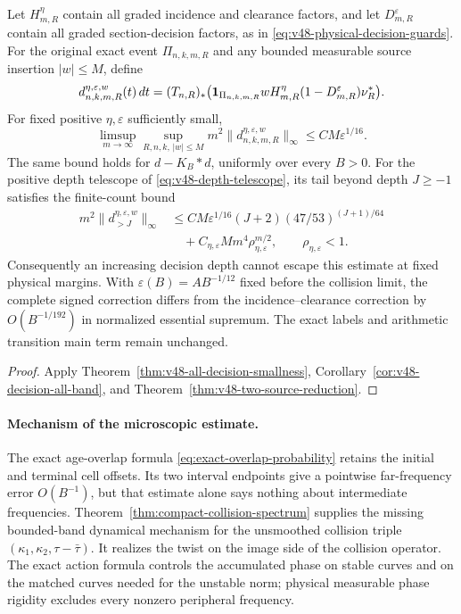 \begin{leadtheorem}
\label{thm:intro-v48-all-decisions}
Let $H_{m,R}^{\eta}$ contain all graded incidence and clearance factors,
and let $D_{m,R}^{\varepsilon}$ contain all graded section-decision
factors, as in \eqref{eq:v48-physical-decision-guards}. For the original
exact event $\Pi_{n,k,m,R}$ and any bounded measurable source insertion
$|w|\le M$, define
\[
 d^{\eta,\varepsilon,w}_{n,k,m,R}(t)\,dt
 =(T_{n,R})_*\bigl(\mathbf1_{\Pi_{n,k,m,R}}wH_{m,R}^{\eta}
                        (1-D_{m,R}^{\varepsilon})\nu_R^*\bigr).
\]
For fixed positive $\eta,\varepsilon$ sufficiently small,
\[
 \limsup_{m\to\infty}\sup_{R,n,k,\,|w|\le M}
             m^2\|d^{\eta,\varepsilon,w}_{n,k,m,R}\|_\infty
                           \le CM\varepsilon^{1/16}.
\]
The same bound holds for $d-K_B*d$, uniformly over every $B>0$.
For the positive depth telescope of \eqref{eq:v48-depth-telescope},
its tail beyond depth $J\ge-1$ satisfies the finite-count bound
\begin{align*}
 m^2\|d_{>J}^{\eta,\varepsilon,w}\|_\infty
 &\le CM\varepsilon^{1/16}(J+2)(47/53)^{(J+1)/64}\\
 &\quad+C_{\eta,\varepsilon}M m^4\rho_{\eta,\varepsilon}^{m/2},
                      \qquad \rho_{\eta,\varepsilon}<1.
\end{align*}
Consequently an increasing decision depth cannot escape this estimate
at fixed physical margins. With $\varepsilon(B)=AB^{-1/12}$ fixed
before the collision limit, the complete signed correction differs
from the incidence--clearance correction by $O(B^{-1/192})$ in
normalized essential supremum. The exact labels and arithmetic
transition main term remain unchanged.
\end{leadtheorem}
\begin{proof}
Apply Theorem~\ref{thm:v48-all-decision-smallness},
Corollary~\ref{cor:v48-decision-all-band}, and
Theorem~\ref{thm:v48-two-source-reduction}.
\end{proof}

\paragraph{Mechanism of the microscopic estimate.}
The exact age-overlap formula
\eqref{eq:exact-overlap-probability} retains the initial and terminal
cell offsets. Its two interval endpoints give a pointwise far-frequency
error $O(B^{-1})$, but that estimate alone says nothing about intermediate
frequencies. Theorem~\ref{thm:compact-collision-spectrum} supplies the
missing bounded-band dynamical mechanism for the unsmoothed collision
triple $(\kappa_1,\kappa_2,\tau-\bar\tau)$. It realizes the twist on
the image side of the collision operator. The exact action formula
controls the accumulated phase on stable curves and on the matched
curves needed for the unstable norm; physical measurable phase rigidity
excludes every nonzero peripheral frequency.

